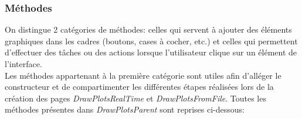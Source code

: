 \subsubsection{Méthodes}

On distingue 2 catégories de méthodes: celles qui servent à ajouter des éléments graphiques dans les cadres (boutons, cases à cocher, etc.) et celles qui permettent d'effectuer des tâches ou des actions lorsque l'utilisateur clique sur un élément de l'interface.\\

Les méthodes appartenant à la première catégorie sont utiles afin d'alléger le constructeur et de compartimenter les différentes étapes réalisées lors de la création des pages \textit{DrawPlotsRealTime} et \textit{DrawPlotsFromFile}. Toutes les méthodes présentes dans \textit{DrawPlotsParent} sont reprises ci-dessous:

